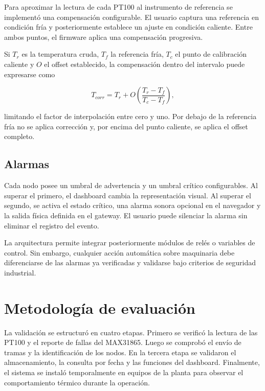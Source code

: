 \documentclass[conference]{IEEEtran}
\begin{document}
Para aproximar la lectura de cada PT100 al instrumento de referencia se implementó una compensación configurable. El usuario captura una referencia en condición fría y posteriormente establece un ajuste en condición caliente. Entre ambos puntos, el firmware aplica una compensación progresiva.

Si $T_r$ es la temperatura cruda, $T_f$ la referencia fría, $T_c$ el punto de calibración caliente y $O$ el offset establecido, la compensación dentro del intervalo puede expresarse como

\begin{equation}
T_{corr}=T_r+O\left(\frac{T_r-T_f}{T_c-T_f}\right),
\label{eq:offset}
\end{equation}

limitando el factor de interpolación entre cero y uno. Por debajo de la referencia fría no se aplica corrección y, por encima del punto caliente, se aplica el offset completo.

\subsection{Alarmas}

Cada nodo posee un umbral de advertencia y un umbral crítico configurables. Al superar el primero, el dashboard cambia la representación visual. Al superar el segundo, se activa el estado crítico, una alarma sonora opcional en el navegador y la salida física definida en el gateway. El usuario puede silenciar la alarma sin eliminar el registro del evento.

La arquitectura permite integrar posteriormente módulos de relés o variables de control. Sin embargo, cualquier acción automática sobre maquinaria debe diferenciarse de las alarmas ya verificadas y validarse bajo criterios de seguridad industrial.

\section{Metodología de evaluación}

La validación se estructuró en cuatro etapas. Primero se verificó la lectura de las PT100 y el reporte de fallas del MAX31865. Luego se comprobó el envío de tramas y la identificación de los nodos. En la tercera etapa se validaron el almacenamiento, la consulta por fecha y las funciones del dashboard. Finalmente, el sistema se instaló temporalmente en equipos de la planta para observar el comportamiento térmico durante la operación.
\end{document}
